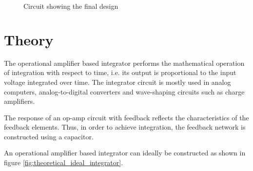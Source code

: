 \documentclass[12pt, titlepage]{article}
\theoremstyle{definition}
\begin{document}
\begin{figure}[h]
\begin{tikzpicture}

      \end{tikzpicture}
      \caption{Circuit showing the final design}
      \label{fig:designed_practical_integrator}
    \end{figure}


  \newpage
  \section{Theory}
    The operational amplifier based integrator performs the mathematical operation of integration with respect to time, i.e. its output is proportional to the input voltage integrated over time.
    The integrator circuit is mostly used in analog computers, analog-to-digital converters and wave-shaping circuits such as charge amplifiers.

    The response of an op-amp circuit with feedback reflects the characteristics of the feedback elements. Thus, in order to achieve integration, the feedback network is constructed using a capacitor.

    An operational amplifier based integrator can ideally be constructed as shown in figure \ref{fig:theoretical_ideal_integrator}.
\end{document}
